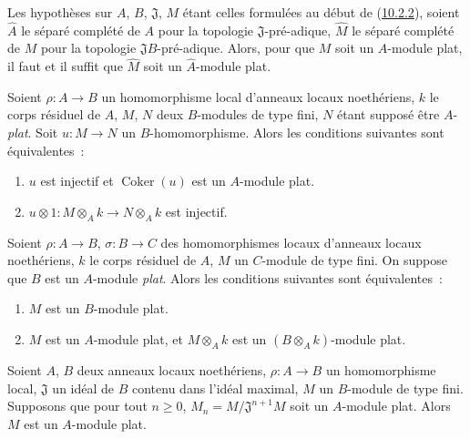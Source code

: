 \begin{env}[10.2.3]
\label{0.10.2.3-fr}
Les hypothèses sur $A$, $B$, $\mathfrak{J}$, $M$ étant celles formulées au
début de (\hyperref[0.10.2.2-fr]{10.2.2}), soient $\widehat A$ le séparé
complété de $A$ pour la topologie $\mathfrak{J}$-pré-adique, $\widehat M$ le
séparé complété de $M$ pour la topologie $\mathfrak{J}B$-pré-adique. Alors,
pour que $M$ soit un $A$-module plat, il faut et il suffit que $\widehat M$
soit un $\widehat A$-module plat.
\end{env}

\begin{env}[10.2.4]
\label{0.10.2.4-fr}
Soient $\rho:A\to B$ un homomorphisme local d'anneaux locaux noethériens, $k$
le corps résiduel de $A$, $M$, $N$ deux $B$-modules de type fini, $N$ étant
supposé être $A$-\emph{plat}. Soit $u:M\to N$ un $B$-homomorphisme. Alors les
conditions suivantes sont équivalentes~:
\begin{enumerate}
  \item[$a)$] $u$ est injectif et $\operatorname{Coker}(u)$ est un $A$-module plat.
  \item[$b)$] $u\otimes1:M\otimes_A k\to N\otimes_A k$ est injectif.
\end{enumerate}
\end{env}

\begin{env}[10.2.5]
\label{0.10.2.5-fr}
Soient $\rho:A\to B$, $\sigma:B\to C$ des homomorphismes locaux d'anneaux
locaux noethériens, $k$ le corps résiduel de $A$, $M$ un $C$-module de type
fini. On suppose que $B$ est un $A$-module \emph{plat}. Alors les conditions
suivantes sont équivalentes~:
\begin{enumerate}
  \item[$a)$] $M$ est un $B$-module plat.
  \item[$b)$] $M$ est un $A$-module plat, et $M\otimes_A k$ est un
    $(B\otimes_A k)$-module plat.
\end{enumerate}
\end{env}

\begin{proposition}[10.2.6]
\label{0.10.2.6-fr}
Soient $A$, $B$ deux anneaux locaux noethériens, $\rho:A\to B$ un
homomorphisme local, $\mathfrak{J}$ un idéal de $B$ contenu dans l'idéal
maximal, $M$ un $B$-module de type fini. Supposons que pour tout $n\geq0$,
$M_n=M/\mathfrak{J}^{n+1}M$ soit un $A$-module plat. Alors $M$ est un
$A$-module plat.
\end{proposition}

